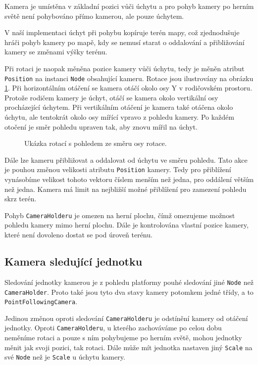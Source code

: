 Kamera je umístěna v základní pozici vůči úchytu a pro pohyb kamery po herním světě není pohybováno přímo kamerou, ale pouze úchytem.

V naší implementaci úchyt při pohybu kopíruje terén mapy, což zjednodušuje hráči pohyb kamery po mapě, kdy se nemusí starat o oddalování a přibližování kamery se změnami výšky terénu. 

Při rotaci je naopak měněna pozice kamery vůči úchytu, tedy je měněn atribut \texttt{Position} na instanci \texttt{Node} obsahující kameru. Rotace jsou ilustrovány na obrázku \ref{fig:rotation}. Při horizontálním otáčení se kamera otáčí okolo osy Y v rodičovském prostoru. Protože rodičem kamery je úchyt, otáčí se kamera okolo vertikální osy procházející úchytem. Při vertikálním otáčení je kamera také otáčena okolo úchytu, ale tentokrát okolo osy mířící vpravo z pohledu kamery. Po každém otočení je směr pohledu upraven tak, aby znovu mířil na úchyt.

\begin{figure}[h]
	\centering
	\fontsize{8pt}{11pt}\selectfont
	\def\svgwidth{\textwidth}
	
	\caption{Ukázka rotací s pohledem ze směru osy rotace.}
	\label{fig:rotation}
\end{figure}

Dále lze kameru přibližovat a oddalovat od úchytu ve směru pohledu. Tato akce je pouhou změnou velikosti atributu \texttt{Position} kamery. Tedy pro přiblížení vynásobíme velikost tohoto vektoru číslem menším než jedna, pro oddálení větším než jedna. Kamera má limit na nejbližší možné přiblížení pro zamezení pohledu skrz terén.

Pohyb \texttt{CameraHolderu} je omezen na herní plochu, čímž omezujeme možnost pohledu kamery mimo herní plochu. Dále je kontrolována vlastní pozice kamery, které není dovoleno dostat se pod úroveň terénu.

\subsection{Kamera sledující jednotku}
Sledování jednotky kamerou je z pohledu platformy pouhé sledování jiné \texttt{Node} než \texttt{CameraHolder}. Proto také jsou tyto dva stavy kamery potomkem jedné třídy, a to \texttt{PointFollowingCamera}. 

Jedinou změnou oproti sledování \texttt{CameraHolderu} je odstínění kamery od otáčení jednotky. Oproti \texttt{CameraHolderu}, u kterého zachováváme po celou dobu neměníme rotaci a pouze s ním pohybujeme po herním světě, mohou jednotky měnit jak svoji pozici, tak rotaci. Dále může mít jednotka nastaven jiný \texttt{Scale} na své \texttt{Node} než je \texttt{Scale} u úchytu kamery. 

